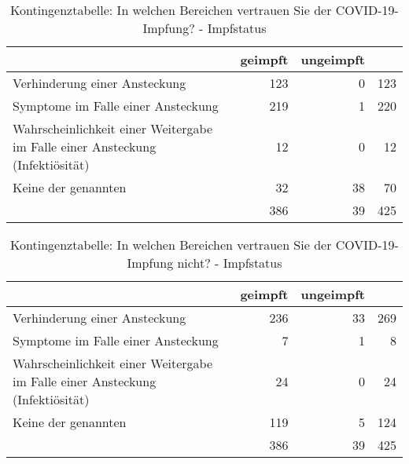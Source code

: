 \begin{table}[ht!]
    \centering
    \begin{tabular} {p{9cm} | r r | r}
        & geimpft & ungeimpft & \\
        \hline
        Verhinderung einer Ansteckung & 123 & 0 & 123 \\
        Symptome im Falle einer Ansteckung & 219 & 1 & 220 \\
        Wahrscheinlichkeit einer Weitergabe im Falle einer Ansteckung (Infektiösität) & 12 & 0 & 12 \\
        Keine der genannten & 32 & 38 & 70 \\
        \hline
        & 386 & 39 & 425 \\
    \end{tabular}
    \caption{Kontingenztabelle: In welchen Bereichen vertrauen Sie der COVID-19-Impfung? - Impfstatus}
    \label{tab:chi_wirksamkeit_impfstatus}
\end{table}

\begin{table}[ht!]
    \centering
    \begin{tabular} {p{9cm} | r r | r}
        & geimpft & ungeimpft & \\
        \hline
        Verhinderung einer Ansteckung & 236 & 33 & 269 \\
        Symptome im Falle einer Ansteckung & 7 & 1 & 8 \\
        Wahrscheinlichkeit einer Weitergabe im Falle einer Ansteckung (Infektiösität) & 24 & 0 & 24 \\
        Keine der genannten & 119 & 5 & 124 \\
        \hline
        & 386 & 39 & 425 \\
    \end{tabular}
    \caption{Kontingenztabelle: In welchen Bereichen vertrauen Sie der COVID-19-Impfung nicht? - Impfstatus}
    \label{tab:chi_nicht_wirksamkeit_impfstatus}
\end{table}